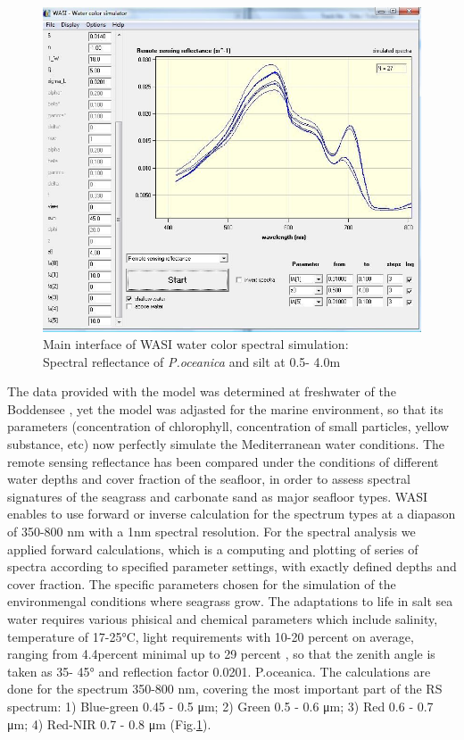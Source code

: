 \documentclass[10pt, a4paper]{article}
\begin{document}
\begin{figure}[h]
\centering
\includegraphics[scale=0.30]{Fig-30.jpg}
\caption{Main interface of WASI water color spectral simulation: \\ Spectral reflectance of \textit{P.oceanica} and silt at 0.5-
4.0m}
\label{fig:30}
\end{figure}

The data provided with the model was determined at freshwater of the Boddensee \cite{Gege05}\label{Gege05}, 
yet the model was adjasted for the marine
environment, so that its parameters (concentration of chlorophyll, concentration of small particles,
yellow substance, etc) now perfectly simulate the Mediterranean water conditions.
The remote sensing reflectance has been compared under the conditions of different water depths and
cover fraction of the seafloor, in order to assess spectral signatures of the seagrass and carbonate sand
as major seafloor types. WASI enables to use forward or inverse calculation for the spectrum types at
a diapason of 350-800 nm with a 1nm spectral resolution. For the spectral analysis we applied
forward calculations, which is a computing and plotting of series of spectra according to specified
parameter settings, with exactly defined depths and cover fraction.
The specific parameters chosen for the simulation of the environmengal conditions where seagrass
grow. The adaptations to life in salt sea water requires various phisical and chemical parameters
which include salinity, temperature of 17-25°C, light requirements with 10-20 percent on average, ranging
from 4.4percent  minimal up to 29 percent \cite{McKenzie09}\label{McKenzie09}, so that the zenith angle is taken as 35-
45° and reflection factor 0.0201. P.oceanica. 
The calculations are done for the spectrum 350-800 nm, covering the most important part of the RS spectrum: 1) Blue-green 0.45 - 0.5 μm; 2) Green 0.5 - 0.6 μm; 3) Red 0.6 - 0.7 μm; 4) Red-NIR 0.7 - 0.8 μm (Fig.\ref{fig:30}).
\end{document}
